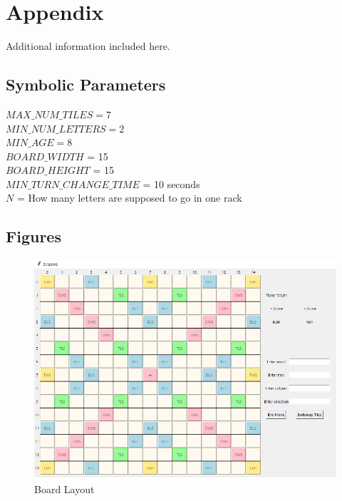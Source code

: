 \documentclass[12pt, titlepage]{article}
\begin{document}




\newpage

\section{Appendix}
\label{sec:appendix}

Additional information included here.

\subsection{Symbolic Parameters}
$MAX\_NUM\_TILES= 7$\\
$MIN\_NUM\_LETTERS = 2$\\
$MIN\_AGE = 8$\\
$BOARD\_WIDTH$ = 15\\
$BOARD\_HEIGHT$ = 15\\
$MIN\_TURN\_CHANGE\_TIME$ = 10 seconds\\
$N$ = How many letters are supposed to go in one rack\\

\subsection{Figures}

\begin{figure}[H]
    \centering
    \includegraphics{TestPlan/Scrabble Board.png}
    \caption{Board Layout}
    \label{fig:my_label}
\end{figure}
\end{document}
